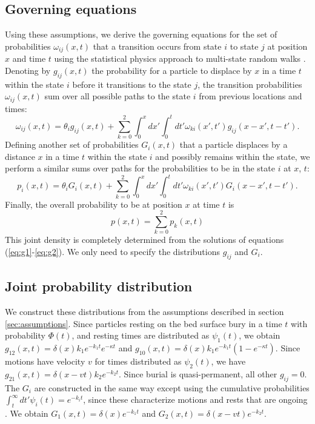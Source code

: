 \documentclass[grl]{agujournal2018}
\newcommand\be{\begin{equation}}
\newcommand\ee{\end{equation}}
\newcommand\om{\omega}
\begin{document}
\subsection{Governing equations}
Using these assumptions, we derive the governing equations for the set of probabilities $\om_{ij}(x,t)$ that a transition occurs from state $i$ to state $j$ at position $x$ and time $t$ using the statistical physics approach to multi-state random walks \citep{Weiss1994,Schmidt2007,Weeks1998}.
Denoting by $g_{ij}(x,t)$ the probability for a particle to displace by $x$ in a time $t$ within the state $i$ before it transitions to the state $j$, the transition probabilities $\om_{ij}(x,t)$ sum over all possible paths to the state $i$ from previous locations and times:
\be \om_{ij}(x,t) = \theta_i g_{ij}(x,t) + \sum_{k=0}^2 \int_0^x dx' \int_0^t dt' \om_{ki}(x',t')g_{ij}(x-x',t-t').\label{eq:g1}\ee
Defining another set of probabilities $G_i(x,t)$ that a particle displaces by a distance $x$ in a time $t$ within the state $i$ and possibly remains within the state, we perform a similar sums over paths for the probabilities to be in the state $i$ at $x$, $t$: 
\be p_i(x,t) = \theta_i G_i(x,t) + \sum_{k=0}^2 \int_0^x dx' \int_0^t dt' \om_{ki}(x',t')G_i(x-x',t-t').\label{eq:g2}\ee
Finally, the overall probability to be at position $x$ at time $t$ is
\be p(x,t) = \sum_{k=0}^2 p_k(x,t) \ee
This joint density is completely determined from the solutions of equations (\ref{eq:g1}-\ref{eq:g2}). We only need to specify the distributions $g_{ij}$ and $G_i$.


\subsection{Joint probability distribution}
\label{sec:solution}

We construct these distributions from the assumptions described in section \ref{sec:assumptions}.
Since particles resting on the bed surface bury in a time $t$ with probability $\Phi(t)$, and resting times are distributed as $\psi_1(t)$, we obtain $g_{12}(x,t) = \delta(x)k_1e^{-k_1t}e^{-\kappa t}$ and $g_{10}(x,t) = \delta(x) k_1 e^{-k_1 t}(1-e^{-\kappa t})$. Since motions have velocity $v$ for times distributed as $\psi_2(t)$, we have $g_{21}(x,t) = \delta(x-vt)k_2e^{-k_2 t}$.
Since burial is quasi-permanent, all other $g_{ij} = 0$.
The $G_i$ are constructed in the same way except using the cumulative probabilities $\int_t^\infty dt'\psi_i(t) = e^{-k_i t}$, since these characterize motions and rests that are ongoing \citep{Weiss1994}.
We obtain $G_1(x,t) = \delta(x)e^{-k_1t}$ and $G_2(x,t) = \delta(x-vt)e^{-k_2 t}$.
\end{document}
